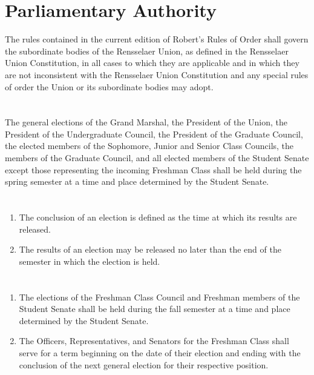 \documentclass{uniondoc}
\begin{document}
\section{Parliamentary Authority}

The rules contained in the current edition of Robert's Rules of Order shall govern the subordinate bodies of the Rensselaer Union, as defined in the Rensselaer Union Constitution, in all cases to which they are applicable and in which they are not inconsistent with the Rensselaer Union Constitution and any special rules of order the Union or its subordinate bodies may adopt.


\section{}

The general elections of the Grand Marshal, the President of the Union, the President of the Undergraduate Council, the President of the Graduate Council, the elected members of the Sophomore, Junior and Senior Class Councils, the members of the Graduate Council, and all elected members of the Student Senate except those representing the incoming Freshman Class shall be held during the spring semester at a time and place determined by the Student Senate.

\section{}

\begin{enumerate}
\item The conclusion of an election is defined as the time at which its results are released.
\item The results of an election may be released no later than the end of the semester in which the election is held.
\end{enumerate}

\section{}

\begin{enumerate}
\item The elections of the Freshman Class Council and Freshman members of the Student Senate shall be held during the fall semester at a time and place determined by the Student Senate.
\item The Officers, Representatives, and Senators for the Freshman Class shall serve for a term beginning on the date of their election and ending with the conclusion of the next general election for their respective position.
\end{enumerate}
\end{document}
